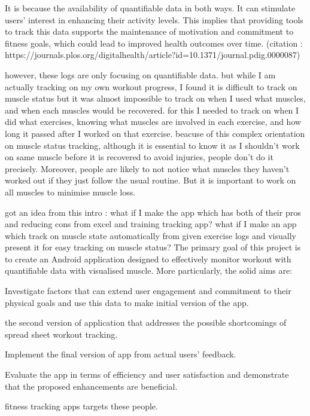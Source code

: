 It is because the availability of quantifiable data in both ways. It can stimulate users' interest in enhancing their activity levels. This implies that providing tools to track this data supports the maintenance of motivation and commitment to fitness goals, which could lead to improved health outcomes over time. (citation : https://journals.plos.org/digitalhealth/article?id=10.1371/journal.pdig.0000087)

however, these logs are only focusing on quantifiable data.
but while I am actually tracking on my own workout progress,
I found  it is difficult to track on muscle status
but it was almost impossible to track on when I used what muscles, and when each muscles would be recovered.
for this I needed to track on when I did what exercises, 
knowing what muscles are involved in each exercise,
and how long it passed after I worked on that exercise.
beacuse of this complex orientation on muscle status tracking, although it is essential to know it as  I shouldn't work on same muscle before it is recovered to avoid injuries, people don't do it precisely. 
Moreover, people are likely to not notice what muscles they haven't worked out if they just follow the usual routine.
But it is important to work on all muscles to minimise muscle loss. 

got an idea from this intro : 
what if I make the app which has both of their pros and reducing cons from excel and training tracking app?
what if I make an app which track on muscle state automatically from given exercise logs and visually present it for easy tracking on muscle status?
The primary goal of this project is to create an Android application designed to effectively monitor workout with quantifiable data with visualised muscle.
More particularly, the solid aims are: 

\item Investigate factors that can extend user engagement and commitment to their physical goals and use this data to make initial version of the app.
\item the second version of application that addresses the possible shortcomings of spread sheet workout tracking.
\item Implement the final version of app from actual users' feedback.
\item Evaluate the app in terms of efficiency and user satisfaction and demonstrate that the proposed enhancements are beneficial.


fitness tracking apps targets these people. 


